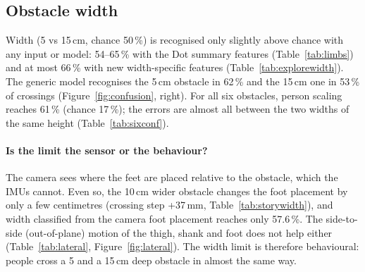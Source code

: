 \subsection{Obstacle width}
\label{sec:res-width}

Width (5 vs 15\,cm, chance 50\,\%) is recognised only slightly above chance with any input or model: 54--65\,\% with the Dot
summary features (Table~\ref{tab:limbs}) and at most 66\,\% with new width-specific features (Table~\ref{tab:explorewidth}).
The generic model recognises the 5\,cm obstacle in 62\,\% and the 15\,cm one in 53\,\% of crossings (Figure~\ref{fig:confusion}, right).
For all six obstacles, person scaling reaches 61\,\% (chance 17\,\%); the errors are almost all between the two widths of the
same height (Table~\ref{tab:sixconf}).

\begin{table}[htbp]
\centering
\caption{Width with new features (person scaling): clearance-shape features, step-relative ratios and their combination.}
\label{tab:explorewidth}

\end{table}

\begin{table}[htbp]
\centering
\caption{Six-obstacle confusion matrix (person scaling, forest, soft vote; rows = true obstacle W[width]H[height]).}
\label{tab:sixconf}

\end{table}

\paragraph{Is the limit the sensor or the behaviour?} The camera sees where the feet are placed relative to the obstacle, which
the IMUs cannot. Even so, the 10\,cm wider obstacle changes the foot placement by only a few centimetres (crossing step
+37\,mm, Table~\ref{tab:storywidth}), and width classified from the camera foot placement reaches only 57.6\,\%. The side-to-side
(out-of-plane) motion of the thigh, shank and foot does not help either (Table~\ref{tab:lateral}, Figure~\ref{fig:lateral}).
The width limit is therefore behavioural: people cross a 5 and a 15\,cm deep obstacle in almost the same way.

\begin{table}[htbp]
\centering
\caption{Effect of width on the foot placement seen by the camera and on the Dot trajectory (W2 $-$ W1, median over participants).}
\label{tab:storywidth}

\end{table}


